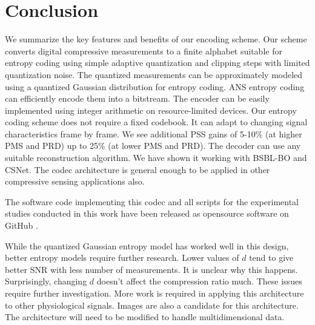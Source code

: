 \section{Conclusion}
\label{sec:conclusion}

We summarize the key features and benefits of our encoding scheme.
Our scheme converts digital compressive measurements
to a finite alphabet suitable for entropy coding using
simple adaptive quantization and clipping steps with limited quantization noise.
The quantized measurements can be approximately modeled using a quantized
Gaussian distribution for entropy coding.
ANS entropy coding can efficiently encode them into a
bitstream.
The encoder can be easily implemented using integer arithmetic
on resource-limited devices.
Our entropy coding scheme does not require a fixed codebook.
It can adapt to changing signal characteristics frame by frame. 
We see additional PSS gains of 5-10\% (at higher PMS and PRD)
up to 25\% (at lower PMS and PRD).
The decoder can use any suitable reconstruction algorithm.
We have shown it working with BSBL-BO and CSNet.  
The codec architecture is general enough to be applied
in other compressive sensing applications also.

The software code implementing this codec
and all scripts for the experimental studies conducted
in this work have been released as opensource software
on GitHub \cite{kumar2022ecgcodec}.

While the quantized Gaussian entropy model has worked well in this
design, better entropy models require further research.
Lower values of $d$ tend to give better SNR with less number
of measurements. It is unclear why this happens. Surprisingly,
changing $d$ doesn't affect the compression ratio much.
These issues require further investigation.
More work is required in applying this architecture to other
physiological signals. Images are also a candidate for this
architecture. The architecture will need to be modified
to handle multidimensional data. 
